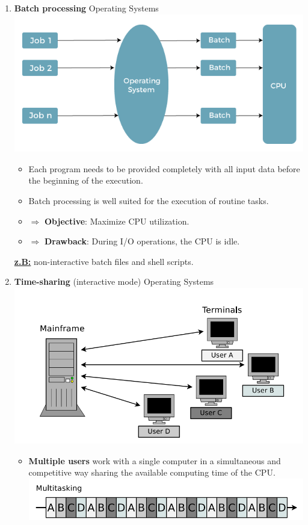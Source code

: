 \documentclass{article}
\begin{document}
\begin{enumerate}
        \item \textbf{Batch processing} Operating Systems \\
        \includegraphics[width=.7\textwidth]{img/batch-operating-system1.png}
            \begin{itemize}
                \item Each program needs to be provided completely with all input data before the beginning of the execution.

                \item Batch processing is well suited for the execution of routine tasks.

                \item $\Rightarrow$ \textbf{Objective}: Maximize CPU utilization.
                
                \item $\Rightarrow$ \textbf{Drawback}: During I/O operations, the CPU is idle.
                
            \end{itemize}
        
        \underline{\textbf{z.B:}} non-interactive batch files and shell scripts.

        \item \textbf{Time-sharing} (interactive mode) Operating Systems \\ 
        \includegraphics[width=.7\textwidth]{img/time-sharing.png}
        \begin{itemize}
            \item \textbf{Multiple users} work with a single computer in a simultaneous and competitive way sharing the available computing time of the CPU. \\
             \includegraphics[width=.74\textwidth]{img/time-sharing-multitasking.png}


\end{itemize}
\end{enumerate}
\end{document}
